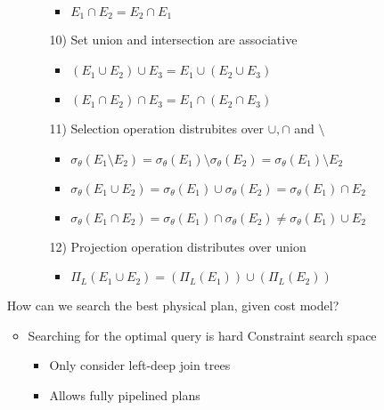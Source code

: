 \begin{itemize}
\begin{itemize}
\begin{itemize}
\begin{itemize}
                            \item $E_1 \cap E_2 = E_2 \cap E_1$
                        \end{itemize}
                    \item[10)] Set union and intersection are associative
                        \begin{itemize}
                            \item $(E_1 \cup E_2) \cup E_3 = E_1 \cup (E_2 \cup E_3)$
                            \item $(E_1 \cap E_2) \cap E_3 = E_1 \cap (E_2 \cap E_3)$
                        \end{itemize}
                    \item[11)] Selection operation distrubites over $\cup, \cap$ and $\setminus$
                        \begin{itemize}
                            \item $\sigma_\theta(E_1 \setminus E_2) = \sigma_\theta(E_1) \setminus \sigma_\theta(E_2) = \sigma_\theta(E_1) \setminus E_2$
                            \item $\sigma_\theta(E_1 \cup E_2) = \sigma_\theta(E_1) \cup \sigma_\theta(E_2) = \sigma_\theta(E_1) \cap E_2$
                            \item $\sigma_\theta(E_1 \cap E_2) = \sigma_\theta(E_1) \cap \sigma_\theta(E_2) \neq \sigma_\theta(E_1) \cup E_2$
                        \end{itemize}
                    \item[12)] Projection operation distributes over union
                        \begin{itemize}
                            \item $\Pi_L(E_1 \cup E_2) = (\Pi_L(E_1)) \cup (\Pi_L(E_2))$
                        \end{itemize}
                \end{itemize}
        \end{itemize}
     How can we search the best physical plan, given cost model?
        \begin{itemize}
            \item Searching for the optimal query is hard
             Constraint search space
                \begin{itemize}
                    \item Only consider left-deep join trees
                    \item Allows fully pipelined plans

\end{itemize}
\end{itemize}
\end{itemize}
